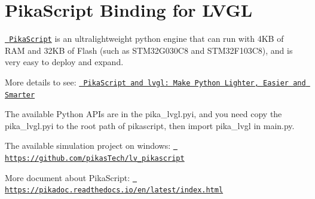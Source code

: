 \chapter{Pika\+Script Binding for LVGL}
\hypertarget{md_managed__components_2lvgl____lvgl_2env__support_2pikascript_2README}{}\label{md_managed__components_2lvgl____lvgl_2env__support_2pikascript_2README}
\label{md_managed__components_2lvgl____lvgl_2env__support_2pikascript_2README_autotoc_md557}%
%
 \href{https://github.com/pikasTech/pikascript}{\texttt{ Pika\+Script}} is an ultralightweight python engine that can run with 4KB of RAM and 32KB of Flash (such as STM32\+G030\+C8 and STM32\+F103\+C8), and is very easy to deploy and expand.

More details to see\+: \href{https://blog.lvgl.io/2022-08-24/pikascript-and-lvgl}{\texttt{ Pika\+Script and lvgl\+: Make Python Lighter, Easier and Smarter}}

The available Python APIs are in the {\ttfamily pika\+\_\+lvgl.\+pyi}, and you need copy the {\ttfamily pika\+\_\+lvgl.\+pyi} to the root path of pikascript, then {\ttfamily import pika\+\_\+lvgl} in {\ttfamily main.\+py}.

The available simulation project on windows\+: \href{https://github.com/pikasTech/lv_pikascript}{\texttt{ https\+://github.\+com/pikas\+Tech/lv\+\_\+pikascript}}

More document about Pika\+Script\+: \href{https://pikadoc.readthedocs.io/en/latest/index.html}{\texttt{ https\+://pikadoc.\+readthedocs.\+io/en/latest/index.\+html}} 